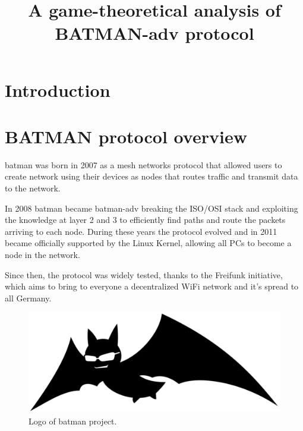\documentclass[conference]{IEEEtran}
\begin{document}
\title{A game-theoretical analysis of BATMAN-adv protocol}

\author{
\and
{}
}

\maketitle

\begin{abstract}

\end{abstract}

\section{Introduction}

\section{BATMAN protocol overview}

\gls{batman} was born in 2007 as a mesh networks protocol that allowed users to
create network using their devices as nodes that routes traffic and transmit
data to the network.

In 2008 \gls{batman} became \gls{batman}-adv breaking the ISO/OSI stack and
exploiting the knowledge at layer 2 and 3 to efficiently find paths and route
the packets arriving to each node. During these years the protocol evolved and
in 2011 became officially supported by the Linux Kernel, allowing all PCs to
become a node in the network.

Since then, the protocol was widely tested, thanks to the Freifunk initiative,
which aims to bring to everyone a decentralized WiFi network and it's spread to
all Germany.

\begin{figure}[h]
  \centering
  \includegraphics[width=0.8\linewidth]{figures/logo.pdf}
  \caption{Logo of \gls{batman} project.}
  \label{fig:batman_logo}
\end{figure}
\end{document}
